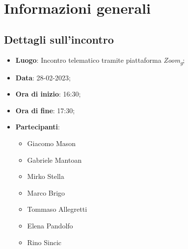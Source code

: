 \section{Informazioni generali}

\subsection{Dettagli sull'incontro}
\begin{itemize}
\item \textbf{Luogo}: Incontro telematico tramite piattaforma \textit{Zoom\textsubscript{g}};
\item \textbf{Data}: 28-02-2023;
\item \textbf{Ora di inizio}: 16:30;
\item \textbf{Ora di fine}: 17:30;
\item \textbf{Partecipanti}: 
\begin{itemize}
	\item Giacomo Mason
	\item Gabriele Mantoan
	\item Mirko Stella
	\item Marco Brigo
	\item Tommaso Allegretti
	\item Elena Pandolfo
	\item Rino Sincic
\end{itemize}
\end{itemize}